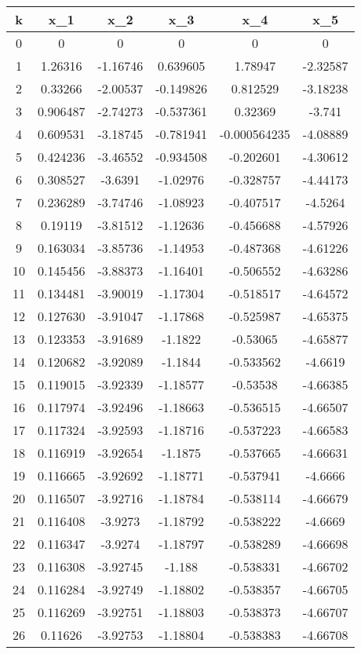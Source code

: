 \documentclass[12pt,leqno,a4paper]{article}
\begin{document}
\begin{table}[h!]
\centering
 \begin{tabular}{||c c c c c c||} 
 \hline
 k & x_{1} & x_{2} & x_{3} & x_{4} & x_{5} \\ [0.5ex] 
 \hline\hline
 0 & 0 & 0 & 0 & 0 & 0\\ 
 1 & 1.26316 & -1.16746 & 0.639605 & 1.78947 & -2.32587\\ 
 2 & 0.33266 & -2.00537 & -0.149826 & 0.812529 & -3.18238\\ 
 3 & 0.906487 & -2.74273 & -0.537361 & 0.32369 & -3.741\\ 
 4 & 0.609531 & -3.18745 & -0.781941 & -0.000564235 & -4.08889\\ 
 5 & 0.424236 & -3.46552 & -0.934508 & -0.202601 & -4.30612\\ 
 6 & 0.308527 & -3.6391 & -1.02976 & -0.328757 & -4.44173\\ 
 7 & 0.236289 & -3.74746 & -1.08923 & -0.407517 & -4.5264\\ 
 8 & 0.19119 & -3.81512 & -1.12636 & -0.456688 & -4.57926\\ 
 9 & 0.163034 & -3.85736 & -1.14953 & -0.487368 & -4.61226\\ 
 10 & 0.145456 & -3.88373 & -1.16401 & -0.506552 & -4.63286\\ 
 11 & 0.134481 & -3.90019 & -1.17304 & -0.518517 & -4.64572\\ 
 12 & 0.127630 & -3.91047 & -1.17868 & -0.525987 & -4.65375\\ 
 13 & 0.123353 & -3.91689 & -1.1822 & -0.53065 & -4.65877\\ 
 14 & 0.120682 & -3.92089 & -1.1844 & -0.533562 & -4.6619\\ 
 15 & 0.119015 & -3.92339 & -1.18577 & -0.53538 & -4.66385\\ 
 16 & 0.117974 & -3.92496 & -1.18663 & -0.536515 & -4.66507\\
 17 & 0.117324 & -3.92593 & -1.18716 & -0.537223 & -4.66583\\
 18 & 0.116919 & -3.92654 & -1.1875 & -0.537665 & -4.66631\\
 19 & 0.116665 & -3.92692 & -1.18771 & -0.537941 & -4.6666\\
 20 & 0.116507 & -3.92716 & -1.18784 & -0.538114 & -4.66679\\
 21 & 0.116408 & -3.9273 & -1.18792 & -0.538222 & -4.6669\\
 22 & 0.116347 & -3.9274 & -1.18797 & -0.538289 & -4.66698\\
 23 & 0.116308 & -3.92745 & -1.188 & -0.538331 & -4.66702\\
 24 & 0.116284 & -3.92749 & -1.18802 & -0.538357 & -4.66705\\
 25 & 0.116269 & -3.92751 & -1.18803 & -0.538373 & -4.66707\\
 26 & 0.11626 & -3.92753 & -1.18804 & -0.538383 & -4.66708\\
 \hline
 \end{tabular}
\end{table}
\end{document}
